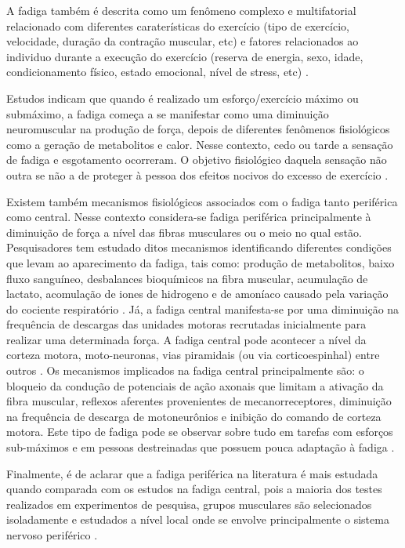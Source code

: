 A fadiga também é descrita como um fenômeno complexo e multifatorial relacionado com diferentes caraterísticas do exercício (tipo de exercício, velocidade, duração da contração muscular, etc) e fatores relacionados ao individuo durante a execução do exercício (reserva de energia, sexo, idade, condicionamento físico, estado emocional, nível de stress, etc) \cite{Ament2009}.

Estudos indicam que quando é realizado um esforço/exercício máximo ou submáximo, a fadiga começa a se manifestar como uma diminuição neuromuscular na produção de força, depois de diferentes fenômenos fisiológicos como a geração de metabolitos e calor\cite{Ament2009}. Nesse contexto, cedo ou tarde a sensação de fadiga e esgotamento ocorreram. O objetivo fisiológico daquela sensação não outra se não a de proteger à pessoa dos efeitos nocivos do excesso de exercício \cite{Zory2005}.

Existem também mecanismos fisiológicos associados com o fadiga tanto periférica como central. Nesse contexto considera-se fadiga periférica principalmente à diminuição de força a nível das fibras musculares ou o meio no qual estão. Pesquisadores tem estudado ditos mecanismos identificando diferentes condições que levam ao aparecimento da fadiga, tais como: produção de metabolitos, baixo fluxo sanguíneo, desbalances bioquímicos na fibra muscular, acumulação de lactato, acomulação de iones de hidrogeno e de amoníaco causado pela variação do cociente respiratório \cite{ArceRodriguez2015, Vollestad1997}. Já, a fadiga central manifesta-se por uma diminuição na frequência de descargas das unidades motoras recrutadas inicialmente para realizar uma determinada força. A fadiga central pode acontecer a nível da corteza motora, moto-neuronas, vias piramidais (ou via corticoespinhal) entre outros \cite{Westerblad2002}. Os mecanismos implicados na fadiga central principalmente são: o bloqueio da condução de potenciais de ação axonais que limitam a ativação da fibra muscular, reflexos aferentes provenientes de mecanorreceptores, diminuição na frequência de descarga de motoneurônios e inibição do comando de corteza motora. Este tipo de fadiga pode se observar sobre tudo em tarefas com esforços sub-máximos e em pessoas destreinadas que possuem pouca adaptação à fadiga \cite{ArceRodriguez2015, Westerblad2002, Ascensao2003}.

Finalmente, é de aclarar que a fadiga periférica na literatura é mais estudada quando comparada com os estudos na fadiga central, pois a maioria dos testes realizados em experimentos de pesquisa, grupos musculares são selecionados isoladamente e estudados a nível local onde se envolve principalmente o sistema nervoso periférico \cite{ArceRodriguez2015}.

